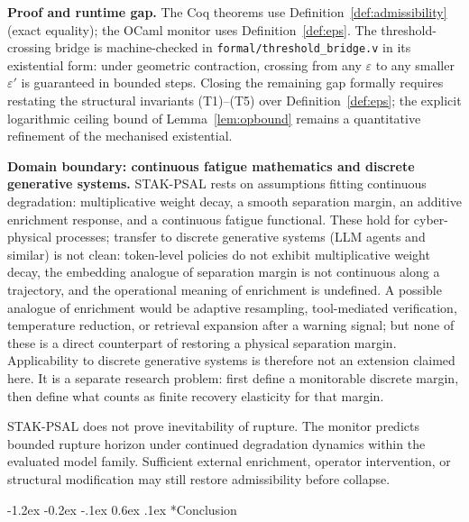 \documentclass{llncs}
\makeatletter
\renewcommand\section{\@startsection{section}{1}{\z@}%
  {-1.2ex \@plus -0.2ex \@minus -.1ex}%
  {0.6ex \@plus .1ex}%
  {\normalfont\large\bfseries}}
\makeatother
\begin{document}
\textbf{Proof and runtime gap.} The Coq theorems use
Definition~\ref{def:admissibility} (exact equality); the OCaml monitor
uses Definition~\ref{def:eps}. The threshold-crossing bridge is
machine-checked in \texttt{formal/\allowbreak{}threshold\_bridge.v} in its
existential form: under geometric contraction, crossing from any
$\varepsilon$ to any smaller $\varepsilon'$ is guaranteed in bounded
steps. Closing the remaining gap formally requires restating the
structural invariants (T1)--(T5) over Definition~\ref{def:eps}; the
explicit logarithmic ceiling bound of Lemma~\ref{lem:opbound} remains a
quantitative refinement of the mechanised existential.

\textbf{Domain boundary: continuous fatigue mathematics and discrete
generative systems.} STAK-PSAL rests on assumptions fitting continuous
degradation: multiplicative weight decay, a smooth separation margin,
an additive enrichment response, and a continuous fatigue functional.
These hold for cyber-physical processes; transfer to discrete generative
systems (LLM agents and similar) is not clean: token-level policies do
not exhibit multiplicative weight decay, the embedding analogue of
separation margin is not continuous along a trajectory, and the
operational meaning of enrichment is undefined. A possible analogue of
enrichment would be adaptive resampling, tool-mediated verification,
temperature reduction, or retrieval expansion after a warning signal; but
none of these is a direct counterpart of restoring a physical separation
margin. Applicability to discrete generative systems is therefore not an
extension claimed here. It is a separate research problem: first define a
monitorable discrete margin, then define what counts as finite recovery
elasticity for that margin.

STAK-PSAL does not prove inevitability of rupture. The monitor predicts
bounded rupture horizon under continued degradation dynamics within the
evaluated model family. Sufficient external enrichment, operator
intervention, or structural modification may still restore admissibility
before collapse.

\section*{Conclusion}
\end{document}
